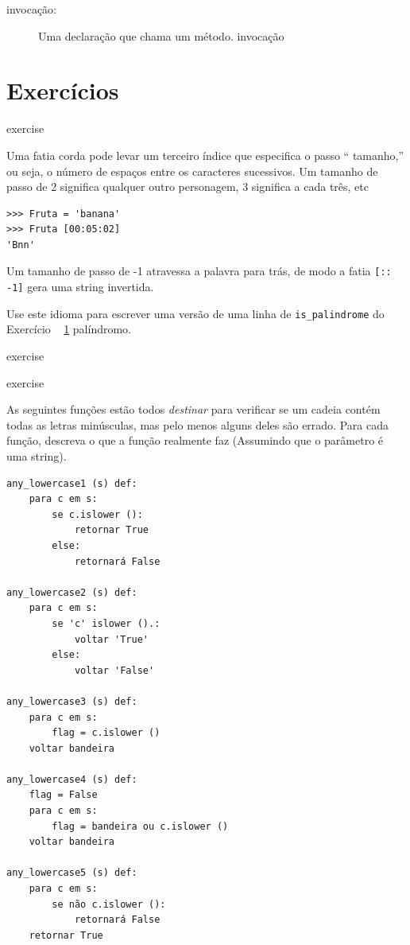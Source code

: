 \documentclass[10pt]{book}
\begin{document}
\begin{exercise}
\begin{description}
\item[invocação:] Uma declaração que chama um método.
\index{} invocação

\end{description}


\section{Exercícios}

\begin{} exercise

Uma fatia corda pode levar um terceiro índice que especifica o passo ``
tamanho,'' ou seja, o número de espaços entre os caracteres sucessivos.
Um tamanho de passo de 2 significa qualquer outro personagem, 3 significa a cada três,
etc

\begin{verbatim}
>>> Fruta = 'banana'
>>> Fruta [00:05:02]
'Bnn'
\end{verbatim}

Um tamanho de passo de -1 atravessa a palavra para trás, de modo
a fatia \verb "[:: -1]" gera uma string invertida.

Use este idioma para escrever uma versão de uma linha de \verb "is_palindrome"
do Exercício ~ \ref {} palíndromo.
\end{} exercise


\begin{} exercise

As seguintes funções estão todos {\em destinar} para verificar se um
cadeia contém todas as letras minúsculas, mas pelo menos alguns deles são
errado. Para cada função, descreva o que a função realmente faz
(Assumindo que o parâmetro é uma string).

\begin{verbatim}
any_lowercase1 (s) def:
    para c em s:
        se c.islower ():
            retornar True
        else:
            retornará False

any_lowercase2 (s) def:
    para c em s:
        se 'c' islower ().:
            voltar 'True'
        else:
            voltar 'False'

any_lowercase3 (s) def:
    para c em s:
        flag = c.islower ()
    voltar bandeira

any_lowercase4 (s) def:
    flag = False
    para c em s:
        flag = bandeira ou c.islower ()
    voltar bandeira

any_lowercase5 (s) def:
    para c em s:
        se não c.islower ():
            retornará False
    retornar True
\end{verbatim}


\end{}
\end{exercise}
\end{document}
